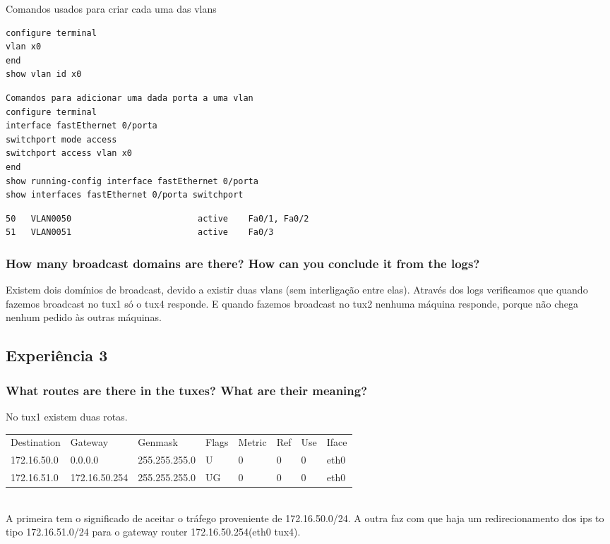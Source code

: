 \documentclass[a4paper]{article}
\begin{document}
Comandos usados para criar cada uma das vlans
\begin{verbatim}
configure terminal
vlan x0
end
show vlan id x0
\end{verbatim}

\begin{verbatim}
Comandos para adicionar uma dada porta a uma vlan
configure terminal
interface fastEthernet 0/porta
switchport mode access
switchport access vlan x0
end
show running-config interface fastEthernet 0/porta
show interfaces fastEthernet 0/porta switchport
\end{verbatim}

\begin{verbatim}
50   VLAN0050                         active    Fa0/1, Fa0/2
51   VLAN0051                         active    Fa0/3
\end{verbatim}

\subsubsection{How many broadcast domains are there? How can you conclude it from the logs?}

Existem dois domínios de broadcast, devido a existir duas vlans (sem interligação entre elas). Através dos logs verificamos que quando fazemos broadcast no tux1 só o tux4 responde. E quando fazemos broadcast no tux2 nenhuma máquina responde, porque não chega nenhum pedido às outras máquinas.

\subsection{Experiência 3}

\subsubsection{What routes are there in the tuxes? What are their meaning?}

No tux1 existem duas rotas.\\
\begin{tabular}{l l l l l l l l}
Destination & Gateway & Genmask & Flags & Metric & Ref & Use & Iface \\
172.16.50.0 & 0.0.0.0 & 255.255.255.0 & U & 0 & 0 & 0 & eth0 \\
172.16.51.0 & 172.16.50.254 & 255.255.255.0 & UG & 0 & 0 & 0 & eth0
\end{tabular}\\
A primeira tem o significado de aceitar o tráfego proveniente de 172.16.50.0/24. A outra faz com que haja um redirecionamento dos ips to tipo 172.16.51.0/24 para o gateway router 172.16.50.254(eth0 tux4).\\
\end{document}
